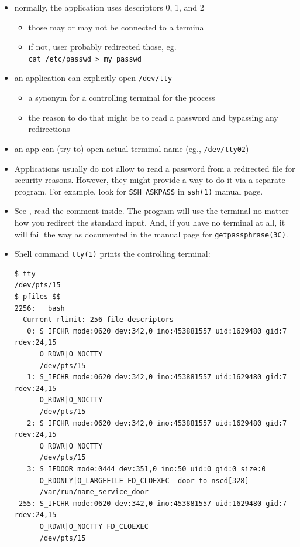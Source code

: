 \begin{itemize}
\item normally, the application uses descriptors 0, 1, and 2
\begin{itemize}
	\item those may or may not be connected to a terminal
	\item if not, user probably redirected those, eg.\\
	\texttt{cat /etc/passwd > my\_passwd}
\end{itemize}

\item an application can explicitly open \texttt{/dev/tty}
\begin{itemize}
	\item a synonym for a controlling terminal for the process
	\item the reason to do that might be to read a password and bypassing
	any redirections
\end{itemize}
\item an app can (try to) open actual terminal name (eg., \texttt{/dev/tty02})
\end{itemize}

\begin{itemize}
\item Applications usually do not allow to read a password from a redirected
file for security reasons. However, they might provide a way to do it via a
separate program. For example, look for \texttt{SSH\_ASKPASS} in \texttt{ssh(1)}
manual page.
\item See , read the comment inside. The
program will use the terminal no matter how you redirect the standard input.
And, if you have no terminal at all, it will fail the way as documented in
the manual page for \texttt{getpassphrase(3C)}.
\item Shell command \texttt{tty(1)} prints the controlling terminal:

\begin{verbatim}
$ tty
/dev/pts/15
$ pfiles $$
2256:   bash
  Current rlimit: 256 file descriptors
   0: S_IFCHR mode:0620 dev:342,0 ino:453881557 uid:1629480 gid:7 rdev:24,15
      O_RDWR|O_NOCTTY
      /dev/pts/15
   1: S_IFCHR mode:0620 dev:342,0 ino:453881557 uid:1629480 gid:7 rdev:24,15
      O_RDWR|O_NOCTTY
      /dev/pts/15
   2: S_IFCHR mode:0620 dev:342,0 ino:453881557 uid:1629480 gid:7 rdev:24,15
      O_RDWR|O_NOCTTY
      /dev/pts/15
   3: S_IFDOOR mode:0444 dev:351,0 ino:50 uid:0 gid:0 size:0
      O_RDONLY|O_LARGEFILE FD_CLOEXEC  door to nscd[328]
      /var/run/name_service_door
 255: S_IFCHR mode:0620 dev:342,0 ino:453881557 uid:1629480 gid:7 rdev:24,15
      O_RDWR|O_NOCTTY FD_CLOEXEC
      /dev/pts/15
\end{verbatim}
\end{itemize}

